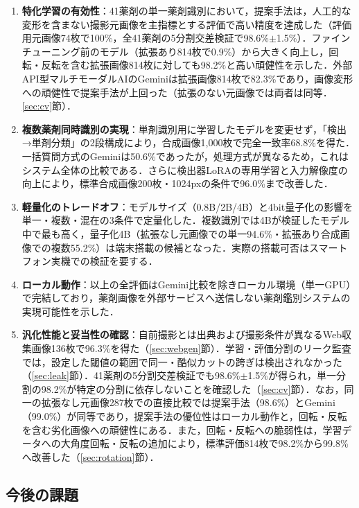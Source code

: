 \documentclass[dvipdfmx]{jsarticle}
\begin{document}
\begin{enumerate}
  \item \textbf{特化学習の有効性}：41薬剤の単一薬剤識別において，提案手法は，人工的な変形を含まない撮影元画像を主指標とする評価で高い精度を達成した（評価用元画像74枚で100\%，全41薬剤の5分割交差検証で98.6\%$\pm$1.5\%）．ファインチューニング前のモデル（拡張あり814枚で0.9\%）から大きく向上し，回転・反転を含む拡張画像814枚に対しても98.2\%と高い頑健性を示した．外部API型マルチモーダルAIのGeminiは拡張画像814枚で82.3\%であり，画像変形への頑健性で提案手法が上回った（拡張のない元画像では両者は同等．\ref{sec:cv}節）．
  \item \textbf{複数薬剤同時識別の実現}：単剤識別用に学習したモデルを変更せず，「検出→単剤分類」の2段構成により，合成画像1,000枚で完全一致率68.8\%を得た．一括質問方式のGeminiは50.6\%であったが，処理方式が異なるため，これはシステム全体の比較である．さらに検出器LoRAの専用学習と入力解像度の向上により，標準合成画像200枚・1024pxの条件で96.0\%まで改善した．
  \item \textbf{軽量化のトレードオフ}：モデルサイズ（0.8B/2B/4B）と4bit量子化の影響を単一・複数・混在の3条件で定量化した．複数識別では4Bが検証したモデル中で最も高く，量子化4B（拡張なし元画像での単一94.6\%・拡張あり合成画像での複数55.2\%）は端末搭載の候補となった．実際の搭載可否はスマートフォン実機での検証を要する．
  \item \textbf{ローカル動作}：以上の全評価はGemini比較を除きローカル環境（単一GPU）で完結しており，薬剤画像を外部サービスへ送信しない薬剤鑑別システムの実現可能性を示した．
  \item \textbf{汎化性能と妥当性の確認}：自前撮影とは出典および撮影条件が異なるWeb収集画像136枚で96.3\%を得た（\ref{sec:webgen}節）．学習・評価分割のリーク監査では，設定した閾値の範囲で同一・酷似カットの跨ぎは検出されなかった（\ref{sec:leak}節）．41薬剤の5分割交差検証でも98.6\%$\pm$1.5\%が得られ，単一分割の98.2\%が特定の分割に依存しないことを確認した（\ref{sec:cv}節）．なお，同一の拡張なし元画像287枚での直接比較では提案手法（98.6\%）とGemini（99.0\%）が同等であり，提案手法の優位性はローカル動作と，回転・反転を含む劣化画像への頑健性にある．また，回転・反転への脆弱性は，学習データへの大角度回転・反転の追加により，標準評価814枚で98.2\%から99.8\%へ改善した（\ref{sec:rotation}節）．
\end{enumerate}

\subsection{今後の課題}
\end{document}
